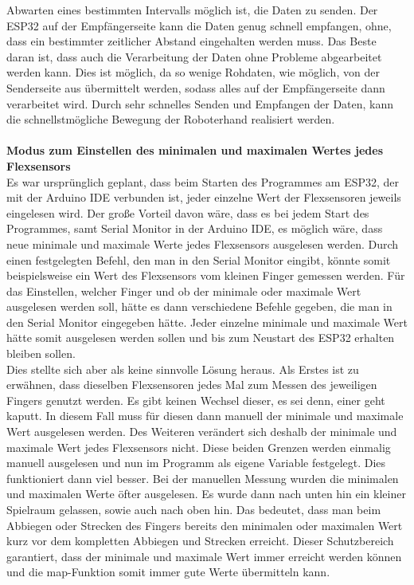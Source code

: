 \documentclass[titlepage,12pt,twoside]{article}
\begin{document}
Abwarten eines bestimmten Intervalls möglich ist, die Daten zu senden. Der ESP32 auf 
der Empfängerseite kann die Daten genug schnell empfangen, ohne, dass ein bestimmter 
zeitlicher Abstand eingehalten werden muss. Das Beste daran ist, dass auch die 
Verarbeitung der Daten ohne Probleme abgearbeitet werden kann. Dies ist möglich, da 
so wenige Rohdaten, wie möglich, von der Senderseite aus übermittelt werden, sodass 
alles auf der Empfängerseite dann verarbeitet wird. Durch sehr schnelles Senden und 
Empfangen der Daten, kann die schnellstmögliche Bewegung der Roboterhand realisiert werden. \\
\\
\textbf{Modus zum Einstellen des minimalen und maximalen Wertes jedes Flexsensors}
\\
Es war ursprünglich geplant, dass beim Starten des Programmes am ESP32, der mit der 
Arduino IDE verbunden ist, jeder einzelne Wert der Flexsensoren jeweils eingelesen 
wird. Der große Vorteil davon wäre, dass es bei jedem Start des Programmes, samt 
Serial Monitor in der Arduino IDE, es möglich wäre, dass neue minimale und maximale 
Werte jedes Flexsensors ausgelesen werden. Durch einen festgelegten Befehl, den man 
in den Serial Monitor eingibt, könnte somit beispielsweise ein Wert des Flexsensors 
vom kleinen Finger gemessen werden. Für das Einstellen, welcher Finger und ob der 
minimale oder maximale Wert ausgelesen werden soll, hätte es dann verschiedene 
Befehle gegeben, die man in den Serial Monitor eingegeben hätte. Jeder einzelne 
minimale und maximale Wert hätte somit ausgelesen werden sollen und bis zum Neustart 
des ESP32 erhalten bleiben sollen. \\
Dies stellte sich aber als keine sinnvolle Lösung heraus. Als Erstes ist zu erwähnen, 
dass dieselben Flexsensoren jedes Mal zum Messen des jeweiligen Fingers genutzt 
werden. Es gibt keinen Wechsel dieser, es sei denn, einer geht kaputt. In diesem 
Fall muss für diesen dann manuell der minimale und maximale Wert ausgelesen werden. 
Des Weiteren verändert sich deshalb der minimale und maximale Wert jedes Flexsensors 
nicht. Diese beiden Grenzen werden einmalig manuell ausgelesen und nun im Programm 
als eigene Variable festgelegt. Dies funktioniert dann viel besser. Bei der manuellen 
Messung wurden die minimalen und maximalen Werte öfter ausgelesen. Es wurde dann 
nach unten hin ein kleiner Spielraum gelassen, sowie auch nach oben hin. Das bedeutet, 
dass man beim Abbiegen oder Strecken des Fingers bereits den minimalen oder maximalen 
Wert kurz vor dem kompletten Abbiegen und Strecken erreicht. Dieser Schutzbereich 
garantiert, dass der minimale und maximale Wert immer erreicht werden können und die 
map-Funktion somit immer gute Werte übermitteln kann. \\
\\
\end{document}
